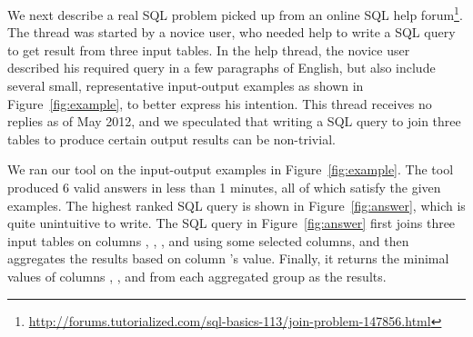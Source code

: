 We next describe a real SQL problem picked up from
an online SQL help forum\footnote{\url{http://forums.tutorialized.com/sql-basics-113/join-problem-147856.html}}.
The thread was started by a novice user, who needed help to write a
SQL query to get result from three input tables. In the help thread, the
novice user described his required query in a few paragraphs of
English, but also include several small, representative input-output
examples as shown in Figure~\ref{fig:example}, to better express
his intention. 
This thread receives no replies as of May 2012, and we speculated that
writing a SQL query to join three tables to produce certain output results
can be non-trivial.

We ran our tool on the input-output examples
in Figure~\ref{fig:example}. The tool produced 6 valid answers
in less than 1 minutes, all of which satisfy the given examples. The
highest ranked SQL query is shown in Figure~\ref{fig:answer},
which is quite unintuitive to write. The SQL query in Figure~\ref{fig:answer}
first joins three input tables
on columns , ,
, and  using some
selected columns, and then aggregates the results based on
column 's value. Finally, it
returns the minimal values of columns , , and 
from each aggregated group as the results.


